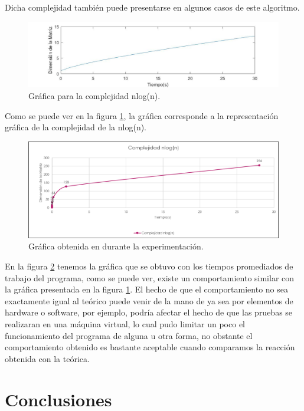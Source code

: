 \documentclass[11pt]{article}
\begin{document}
Dicha complejidad también puede presentarse en algunos casos de este algoritmo. 

\begin{figure}[H]
\centering
\includegraphics[scale=0.5]{gr_fica_complejidad.jpg}
\caption{Gráfica para la complejidad nlog(n).}
\label{fig:14}
\end{figure}

Como se puede ver en la figura \ref{fig:14}, la gráfica corresponde a la representación gráfica de la complejidad de la nlog(n).

\begin{figure}[H]
\centering
\includegraphics[scale=0.5]{grafica.png}
\caption{Gráfica obtenida en durante la experimentación.}
\label{fig:15}
\end{figure}

 En la figura \ref{fig:15} tenemos la gráfica que se obtuvo con los tiempos promediados de trabajo del programa, como se puede ver, existe un comportamiento similar con la gráfica presentada en la figura \ref{fig:14}. El hecho de que el comportamiento no sea exactamente igual al teórico puede venir de la mano de ya sea por elementos de hardware o software, por ejemplo, podría afectar el hecho de que las pruebas se realizaran en una máquina virtual, lo cual pudo limitar un poco el funcionamiento del programa de alguna u otra forma, no obstante el comportamiento obtenido es bastante aceptable cuando comparamos la reacción obtenida con la teórica.

\section{Conclusiones}
\end{document}
